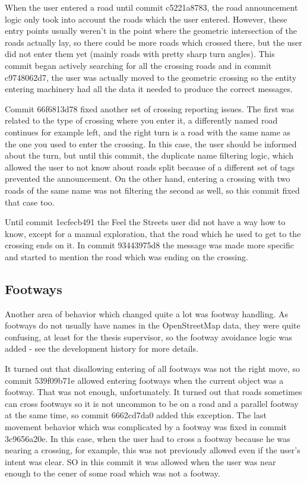 \documentclass[nolof,digital]{fithesis3}
\begin{document}
When the user entered a road until commit c5221a8783, the road announcement logic only took into account the roads which the user entered. However, these entry points usually weren't in the point where the geometric intersection of the roads actually lay, so there could be more roads which crossed there, but the user did not enter them yet (mainly roads with pretty sharp turn angles). This commit began actively searching for all the crossing roads and in commit c9748062d7, the user was actually moved to the geometric crossing so the entity entering machinery had all the data it needed to produce the correct messages.

Commit 66f6813d78 fixed another set of crossing reporting issues. The first was related to the type of crossing where you enter it, a differently named road continues for example left, and the right turn is a road with the same name as the one you used to enter the crossing. In this case, the user should be informed about the turn, but until this commit, the duplicate name filtering logic, which allowed the user to not know about roads split because of a different set of tags prevented the announcement. On the other hand, entering a crossing with two roads of the same name was not filtering the second as well, so this commit fixed that case too.

Until commit 1ecfecb491 the Feel the Streets user did not have a way how to know, except for a manual exploration, that the road which he used to get to the crossing ends on it. In commit 93443975d8 the message was made more specific and started to mention the road which was ending on the crossing.
\subsection{Footways}
Another area of behavior which changed quite a lot was footway handling. As footways do not usually have names in the OpenStreetMap data, they were quite confusing, at least for the thesis supervisor, so the footway avoidance logic was added - see the development history for more details.

It turned out that disallowing entering of all footways was not the right move, so commit 539f09b71e allowed entering footways when the current object was a footway. That was not enough, unfortunately. It turned out that roads sometimes can cross footways so it is not uncommon to be on a road and a parallel footway at the same time, so commit 6662cd7da0 added this exception. The last movement behavior which was complicated by a footway was fixed in commit 3c9656a20e. In this case, when the user had to cross a footway because he was nearing a crossing, for example, this was not previously allowed even if the user's intent was clear. SO in this commit it was allowed when the user was near enough to the cener of some road which was not a footway.
\end{document}

